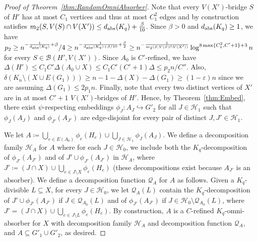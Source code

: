 \documentclass[11pt]{article}
\def\COMMENT#1{}
\numberwithin{equation}{section}
\newcommand{\eps}{\varepsilon}
\newcounter{i}
\theoremstyle{plain}
\theoremstyle{plain} %
\theoremstyle{definition}
\newcommand{\cQ}{\mathcal{Q}}
\newcommand{\cB}{\mathcal{B}}
\newcommand{\cH}{\mathcal{H}}
\begin{document}
\begin{proof}[Proof of Theorem~\ref{thm:RandomOmniAbsorber}]
Note that every $V(X')$-bridge $S$ of $H'$ has at most $C_1$ vertices and thus at most $C_1^2$ edges and by construction satisfies $m_2(S, V(S) \cap V(X')) \leq d_{{\rm abs}}(K_q) + \frac{\beta}{10}$.
Since $\beta > 0$ and $d_{{\rm abs}}(K_q)\ge 1$, we have $p_2 \geq n^{-\frac{1}{d_{{\rm abs}}(K_q)} + \beta}/4 \geq n^{-\frac{1}{d_{{\rm abs}}(K_q) + \beta/10} + \frac{\beta}{2}} \geq n^{-\frac{1}{m_2(S, V(S) \cap V(X'))}}\log^{8\max\{C_1^2, C'+1\}+3}n$ for every $S \in \cB(H', V(X'))$.
Since $A_0$ is $C'$-refined, we have\COMMENT{
    every vertex is in $\Delta(A_0 \cup X)$ edges of $A_0 \cup X$, and each of these are in at most $C'$ of the $J \in \cH_0$, and we have degree at most degree $C_1$ in the absorber for $J$}
    $\Delta(H') \leq C_1 C' \Delta(A_0 \cup X) \leq C_1C'(C' + 1)\Delta \leq p_2 n / C''$.
Also, $\delta(K_n \setminus (X \cup E(G_1))) \geq n - 1 - \Delta(X) - \Delta(G_1) \geq (1 - \eps)n$ since we are assuming $\Delta(G_1) \leq 2p_1 n$.
Finally, note that every two distinct vertices of $X'$ are in at most $C' + 1$ $V(X')$-bridges of $H'$\COMMENT{
    If the two vertices $u_1, u_2$ are together in some $\phi_e(H_e)$ for $e \in E(A_0)$ (either because $e = u_1u_2$ or otherwise), then they are not in any other $\phi_{e'}(H_{e'})$ by the choice of the embeddings, and $e$ is in at most $C'$ of the $J \in \cH_0$ since $A_0$ is $C'$-refined.  
    There is at most one other bridge of $H'$ containing $u_1$ and $u_2$ since there is at most one $J \in \cH_0$ containing edges $e_1$ and $e_2$ such that $u_i \in \phi_{e_i}(V(H_{e_i}))$ for $i \in \{1,2\}$ and $u_i \notin e_i$ for some $i \in \{1,2\}$, and if there is a $J \in \cH_0$ containing edges $e_1$ and $e_2$ such that $u_i \in \phi_{e_i}(V(H_{e_i}))$ and $u_i \in e_i$ for $i \in \{1,2\}$, then $u_1u_2 \in E(A_0)$. 
}.
Hence, 
by Theorem~\ref{thm:Embed}, there exist $\psi$-respecting embeddings $\phi_J : A_J \hookrightarrow G'_2$ for all $J \in \cH_1$ such that $\phi_J(A_J)$ and $\phi_{J'}(A_{J'})$ are edge-disjoint for every pair of distinct $J, J' \in \cH_1$.  

We let $A \coloneqq \bigcup_{e\in E(A_0)}\phi_e(H_e) \cup \bigcup_{J \in \cH_1}\phi_J(A_J)$.
We define a decomposition family $\cH_A$ for $A$ where for each $J \in \cH_0$, we include both the $K_q$-decomposition of $\phi_{J'}(A_{J'})$ and of $J' \cup \phi_{J'}(A_{J'})$ in $\cH_A$, where $J' \coloneqq (J \cap X) \cup \bigcup_{e \in J \setminus X} \phi_e(H_e)$ (these decompositions exist because $A_{J'}$ is an absorber).  We define a decomposition function $\cQ_A$ for $A$ as follows.  Given a $K_q$-divisible $L \subseteq X$, for every $J\in \cH_0$, we let $\cQ_{A}(L)$ contain the $K_q$-decomposition of $J' \cup \phi_{J'}(A_{J'})$ if $J \in \cQ_{A_0}(L)$ and of $\phi_{J'}(A_{J'})$ if $J \in \cH_0\setminus \cQ_{A_0}(L)$, where $J' = (J \cap X) \cup \bigcup_{e \in J \setminus L}\phi_e(H_e)$.  
By construction, $A$ is a $C$-refined $K_q$-omni-absorber for $X$ with decomposition family $\cH_A$ and decomposition function $\cQ_A$, and $A \subseteq G'_1 \cup G'_2$, as desired.
\end{proof}
\end{document}
